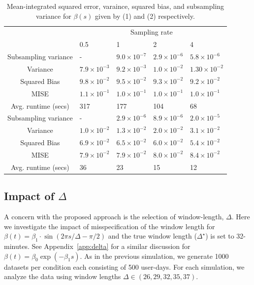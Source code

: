 \documentclass[12pt]{amsart}
\begin{document}
\begin{table}[!th]
\begin{tabular}{c | p{2cm} p{2cm} p{2cm} p{2cm}}
& \multicolumn{4}{c}{Sampling rate} \\ \cline{2-5}
 & 0.5 & 1 & 2 & 4 \\ \hline
Subsampling variance & - & $9.0 \times 10^{-7}$ & $2.9 \times 10^{-6}$ & $5.8 \times 10^{-6}$  \\
Variance & $7.9 \times 10^{-3}$ & $9.2 \times 10^{-3}$ & $1.0 \times 10^{-2}$ & $1.30 \times 10^{-2}$ \\
Squared Bias & $9.8 \times 10^{-2}$ & $9.5 \times 10^{-2}$ & $9.3 \times 10^{-2}$ & $9.2 \times 10^{-2}$   \\
MISE & $1.1 \times 10^{-1}$ & $1.0 \times 10^{-1}$ & $1.0 \times 10^{-1}$ & $1.0 \times 10^{-1}$ \\ \hline
Avg. runtime (secs) & 317 & 177 & 104 & 68 \\ \hline
Subsampling variance & - & $2.9 \times 10^{-6}$ & $8.9 \times 10^{-6}$ & $2.0 \times 10^{-5}$  \\
Variance & $1.0 \times 10^{-2}$ & $1.3 \times 10^{-2}$ & $2.0 \times 10^{-2}$ & $3.1 \times 10^{-2}$ \\
Squared Bias & $6.9 \times 10^{-2}$ & $6.5 \times 10^{-2}$ & $6.0 \times 10^{-2}$ & $5.4 \times 10^{-2}$   \\
MISE & $7.9 \times 10^{-2}$ & $7.9 \times 10^{-2}$ & $8.0 \times 10^{-2}$ & $8.4 \times 10^{-2}$ \\ \hline
Avg. runtime (secs) & 36 & 23 & 15 & 12 \\ \hline
\end{tabular}
\caption{Mean-integrated squared error, varaince, squared bias, and subsampling variance for $\beta(s)$ given by (1) and (2) respectively.}
\label{tab:mise}
\end{table}

\subsection{Impact of $\Delta$}

A concern with the proposed approach is the selection of window-length, $\Delta$.  Here we investigate the impact of misspecification of the window length for $\beta(t) = \beta_1 \cdot \sin \left( 2 \pi s / \Delta - \pi /2 \right)$ and the true window length ($\Delta^\star$) is set to 32-minutes.  See Appendix~\ref{app:delta} for a similar discussion for $\beta(t) = \beta_0 \exp \left( - \beta_1 s \right)$.  As in the previous simulation, we generate 1000 datasets per condition each consisting of 500 user-days.  For each simulation, we analyze the data using window lengths $\Delta \in (26,29,32,35,37)$.
\end{document}
